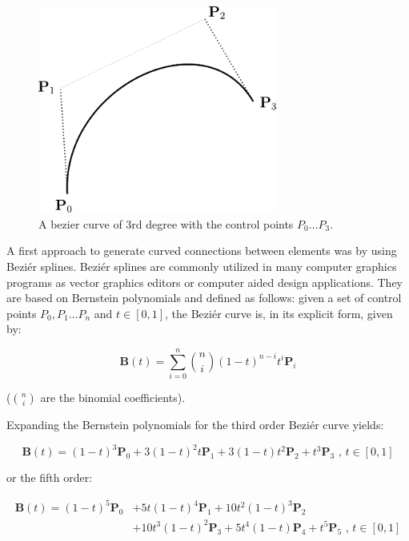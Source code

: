 \begin{figure}
\centering
\includegraphics[width=0.7\textwidth]{images/smooth/bezier_3rd.pdf}
\caption{A bezier curve of 3rd degree with the control points $P_0 \ldots P_3$.}
\label{fig:bez_3rd}
\end{figure}

A first approach to generate curved connections between elements was by using Beziér splines. Beziér splines are commonly utilized in many computer graphics programs as vector graphics editors or computer aided design applications. They are based on Bernstein polynomials and defined as follows: given a set of control points $P_0, P_1 \ldots P_n$ and $t \in \left[ 0, 1\right]$, the Beziér curve is, in its explicit form, given by:

\begin{equation}
\mathbf{B}(t) = \sum_{i=0}^n {n\choose i}(1 - t)^{n - i}t^i\mathbf{P}_i
\end{equation}

(${n\choose i}$ are the binomial coefficients).

Expanding the Bernstein polynomials for the third order Beziér curve yields:

\begin{equation}
\mathbf{B}(t)=(1-t)^3\mathbf{P}_0+3(1-t)^2t\mathbf{P}_1+3(1-t)t^2\mathbf{P}_2+t^3\mathbf{P}_3 \mbox{ , } t \in [0,1]
\end{equation}

or the fifth order:

\begin{equation}
\begin{split}
\mathbf{B}(t) = (1 - t)^5\mathbf{P}_0 & + 5t(1 - t)^4\mathbf{P}_1 + 10t^2(1 - t)^3 \mathbf{P}_2 \\ 
& +  10t^3 (1-t)^2 \mathbf{P}_3 + 5t^4(1-t) \mathbf{P}_4 + t^5 \mathbf{P}_5 \mbox{ , } t \in [0,1]
\end{split}
\label{bez_quint}
\end{equation}


